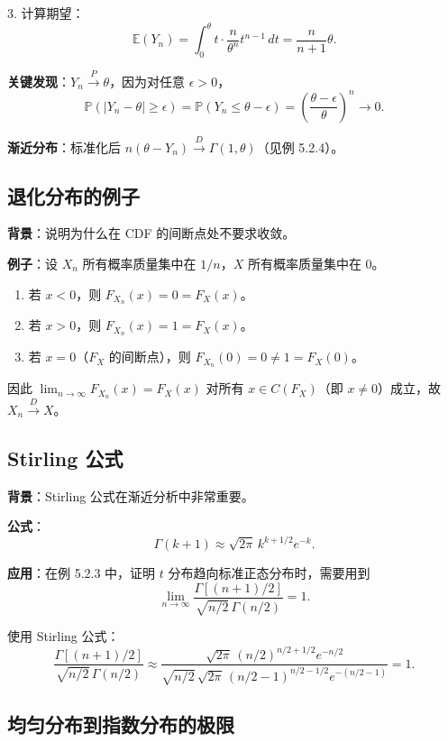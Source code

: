 3. 计算期望：
\[
\mathbb{E}(Y_n) = \int_0^\theta t \cdot \frac{n}{\theta^n}t^{n-1}\,dt = \frac{n}{n+1}\theta.
\]

\textbf{关键发现}：$Y_n \xrightarrow{P} \theta$，因为对任意 $\epsilon > 0$，
\[
\mathbb{P}(|Y_n - \theta| \geq \epsilon) = \mathbb{P}(Y_n \leq \theta - \epsilon) = \left(\frac{\theta - \epsilon}{\theta}\right)^n \to 0.
\]

\textbf{渐近分布}：标准化后 $n(\theta - Y_n) \xrightarrow{D} \Gamma(1, \theta)$（见例 5.2.4）。

\subsection{退化分布的例子}\label{sec:degenerate-distribution}

\textbf{背景}：说明为什么在 CDF 的间断点处不要求收敛。

\textbf{例子}：设 $X_n$ 所有概率质量集中在 $1/n$，$X$ 所有概率质量集中在 $0$。

\begin{enumerate}
\item 若 $x < 0$，则 $F_{X_n}(x) = 0 = F_X(x)$。
\item 若 $x > 0$，则 $F_{X_n}(x) = 1 = F_X(x)$。
\item 若 $x = 0$（$F_X$ 的间断点），则 $F_{X_n}(0) = 0 \neq 1 = F_X(0)$。
\end{enumerate}

因此 $\lim_{n \to \infty} F_{X_n}(x) = F_X(x)$ 对所有 $x \in C(F_X)$（即 $x \neq 0$）成立，故 $X_n \xrightarrow{D} X$。

\subsection{Stirling 公式}\label{sec:stirling-formula}

\textbf{背景}：Stirling 公式在渐近分析中非常重要。

\textbf{公式}：
\[
\Gamma(k + 1) \approx \sqrt{2\pi}\,k^{k+1/2}e^{-k}.
\label{eq:stirling}
\]

\textbf{应用}：在例 5.2.3 中，证明 $t$ 分布趋向标准正态分布时，需要用到
\[
\lim_{n \to \infty} \frac{\Gamma[(n+1)/2]}{\sqrt{n/2}\,\Gamma(n/2)} = 1.
\]

使用 Stirling 公式：
\[
\frac{\Gamma[(n+1)/2]}{\sqrt{n/2}\,\Gamma(n/2)} \approx \frac{\sqrt{2\pi}\,(n/2)^{n/2+1/2}e^{-n/2}}{\sqrt{n/2}\,\sqrt{2\pi}\,(n/2-1)^{n/2-1/2}e^{-(n/2-1)}} = 1.
\]

\subsection{均匀分布到指数分布的极限}\label{sec:uniform-to-exponential}

